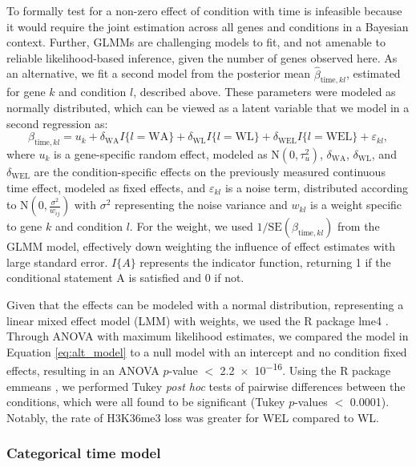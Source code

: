 \documentclass[11pt]{biorxiv}
\begin{document}
To formally test for a non-zero effect of condition with time is infeasible because it would require the joint estimation across all genes and conditions in a Bayesian context. Further, GLMMs are challenging models to fit, and not amenable to reliable likelihood-based inference, given the number of genes observed here. As an alternative, we fit a second model from the posterior mean $\widehat{\beta}_{\text{time}, kl}$, estimated for gene $k$ and condition $l$, described above. These parameters were modeled as normally distributed, which can be viewed as a latent variable that we model in a second regression as:
\begin{equation}
	\beta_{\text{time}, kl} = u_{k} + \delta_{\text{WA}}I\{l = \text{WA}\} + \delta_{\text{WL}}I\{l = \text{WL}\} + \delta_{\text{WEL}}I\{l = \text{WEL}\} + \varepsilon_{kl},
	\label{eq:alt_model}
\end{equation}
where $u_{k}$ is a gene-specific random effect, modeled as $\text{N}(0, \tau^{2}_{u})$, $\delta_{\text{WA}}$, $\delta_{\text{WL}}$, and $\delta_{\text{WEL}}$ are the condition-specific effects on the previously measured continuous time effect, modeled as fixed effects, and $\varepsilon_{kl}$ is a noise term, distributed according to $\text{N}(0, \frac{\sigma^{2}}{w_{ij}})$ with $\sigma^{2}$ representing the noise variance and $w_{kl}$ is a weight specific to gene $k$ and condition $l$. For the weight, we used $1/\text{SE}(\beta_{\text{time}, kl})$ from the GLMM model, effectively down weighting the influence of effect estimates with large standard error. $I\{A\}$ represents the indicator function, returning 1 if the conditional statement A is satisfied and 0 if not. 

Given that the effects can be modeled with a normal distribution, representing a linear mixed effect model (LMM) with weights, we used the R package lme4 \citep{Bates2015}. Through ANOVA \citep{Venables2010} with maximum likelihood estimates, we compared the model in Equation \ref{eq:alt_model} to a null model with an intercept and no condition fixed effects, resulting in an ANOVA $p$-value $<$ \num{2.2e-16}. Using the R package emmeans \citep{emmeans}, we performed Tukey \emph{post hoc} tests of pairwise differences \citep{Venables2010} between the conditions, which were all found to be significant (Tukey $p$-values $<$ 0.0001). Notably, the rate of H3K36me3 loss was greater for WEL compared to WL.

\subsubsection{Categorical time model}
\end{document}
